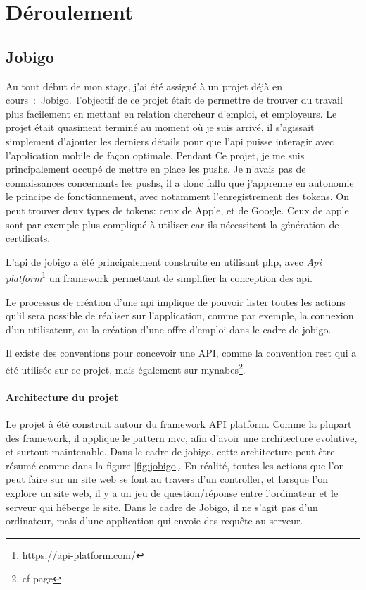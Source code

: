 \documentclass[../rapport.tex]{subfiles}
\begin{document}
    \chapter{Déroulement}
        \section{Jobigo}\label{subsec:jobigo}
        Au tout début de mon stage, j'ai été assigné à un projet déjà en cours~:~Jobigo.\
        l'objectif de
        ce projet était de permettre de trouver du travail plus facilement
        en mettant en relation chercheur d'emploi, et employeurs.
        Le projet était quasiment terminé au moment où je suis arrivé, il s'agissait simplement d'ajouter
        les derniers détails pour que l'\gls{api} puisse interagir avec l'application mobile
        de façon optimale.
        Pendant Ce projet, je me suis principalement occupé de mettre en place les \glspl{push}.
        Je n'avais pas de connaissances concernants les \glspl{push}, il a donc fallu que 
        j'apprenne en autonomie le principe de fonctionnement, avec notamment l'enregistrement 
        des \glspl{token}. On peut trouver deux types de \glspl{token}: ceux de Apple, et de Google.
        Ceux de apple sont par exemple plus compliqué à utiliser car ils nécessitent la génération 
        de certificats.

            L'api de jobigo a été principalement construite en utilisant php, avec \textit{Api platform}\footnote{https://api-platform.com/} un \gls{framework} permettant de simplifier la conception des \gls{api}.

        Le processus de création d'une \gls{api} implique de pouvoir lister toutes les actions 
        qu'il sera possible de réaliser sur l'application, comme par exemple, la connexion d'un utilisateur, 
        ou la création d'une offre d'emploi dans le cadre de jobigo.

        Il existe des conventions pour concevoir une API, comme la convention \gls{rest} qui a été utilisée
        sur ce projet, mais également sur mynabes\footnote{cf page \pageref{subsec:mynabes}}.

        \subsubsection{Architecture du projet}
        Le projet à été construit autour du framework API platform. Comme la plupart des framework, il applique le pattern \gls{mvc},
        afin d'avoir une architecture evolutive, et surtout maintenable. Dans le cadre de jobigo, cette architecture peut-être résumé comme dans la figure \ref{fig:jobigo}.
        En réalité, toutes les actions que l'on peut faire sur un site web se font au travers d'un controller, et lorsque l'on explore un site web, il y a un jeu de question/réponse entre l'ordinateur et le serveur qui héberge le site. Dans le cadre de Jobigo, il ne s'agit pas d'un ordinateur, mais d'une application qui envoie des requête au serveur.
\end{document}
